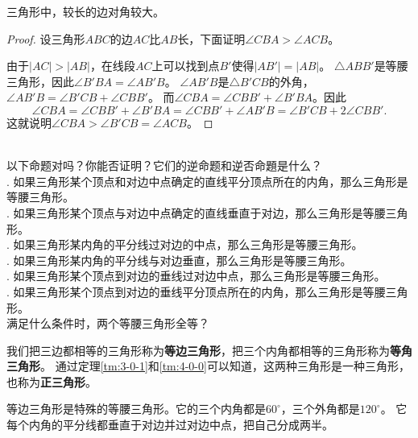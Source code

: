 \documentclass[12pt,UTF8,fontset=none]{ctexbook}
\begin{document}
\begin{tm}\label{tm:4-0-1}
    三角形中，较长的边对角较大。
\end{tm}

\begin{proof}
    设三角形$ABC$的边$AC$比$AB$长，下面证明$\angle CBA > \angle ACB$。

    由于$|AC| > |AB|$，在线段$AC$上可以找到点$B'$使得$|AB'| = |AB|$。
    $\triangle ABB'$是等腰三角形，因此$\angle B'BA = \angle AB'B$。
    $\angle AB'B$是$\triangle B'CB$的外角，$\angle AB'B = \angle B'CB + \angle CBB'$。
    而$\angle CBA = \angle CBB' + \angle B'BA$。因此
    $$ \angle CBA = \angle CBB' + \angle B'BA = \angle CBB' + \angle AB'B = \angle B'CB + 2\angle CBB'.$$
    这就说明$\angle CBA > \angle B'CB = \angle ACB$。
\end{proof}

\begin{sk}\label{sk:4-0-0}
    \mbox{}\\
    以下命题对吗？你能否证明？它们的逆命题和逆否命題是什么？\\
    . 如果三角形某个顶点和对边中点确定的直线平分顶点所在的内角，那么三角形是等腰三角形。\\
    . 如果三角形某个顶点与对边中点确定的直线垂直于对边，那么三角形是等腰三角形。\\
    . 如果三角形某内角的平分线过对边的中点，那么三角形是等腰三角形。\\
    . 如果三角形某内角的平分线与对边垂直，那么三角形是等腰三角形。\\
    . 如果三角形某个顶点到对边的垂线过对边中点，那么三角形是等腰三角形。\\
    . 如果三角形某个顶点到对边的垂线平分顶点所在的内角，那么三角形是等腰三角形。\\
    满足什么条件时，两个等腰三角形全等？\\
\end{sk}

我们把三边都相等的三角形称为\textbf{等边三角形}，把三个内角都相等的三角形称为\textbf{等角三角形}。
通过定理\ref{tm:3-0-1}和\ref{tm:4-0-0}可以知道，这两种三角形是一种三角形，也称为\textbf{正三角形}。

等边三角形是特殊的等腰三角形。它的三个内角都是$60^\circ$，三个外角都是$120^\circ$。
它每个内角的平分线都垂直于对边并过对边中点，把自己分成两半。
\end{document}

